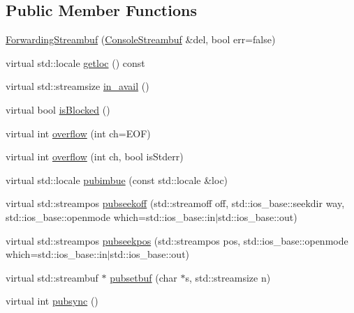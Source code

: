 \subsection*{Public Member Functions}
\begin{DoxyCompactItemize}
\item 
\mbox{\hyperlink{classstanfordcpplib_1_1ForwardingStreambuf_a8117dcf1a6c10e98afb196a6f1346dd9}{Forwarding\+Streambuf}} (\mbox{\hyperlink{classstanfordcpplib_1_1ConsoleStreambuf}{Console\+Streambuf}} \&del, bool err=false)
\item 
virtual std\+::locale \mbox{\hyperlink{classstanfordcpplib_1_1ForwardingStreambuf_aaea5d5971e30e03408abc9b4b9cdd332}{getloc}} () const
\item 
virtual std\+::streamsize \mbox{\hyperlink{classstanfordcpplib_1_1ForwardingStreambuf_a7c3ad202fdca7b02e80cce27e4fe009e}{in\+\_\+avail}} ()
\item 
virtual bool \mbox{\hyperlink{classstanfordcpplib_1_1ForwardingStreambuf_a61d5d93ba4956eefeb2e3d617d34c801}{is\+Blocked}} ()
\item 
virtual int \mbox{\hyperlink{classstanfordcpplib_1_1ForwardingStreambuf_adccb3cd5475ba3c83bc2b0a8cbd731c0}{overflow}} (int ch=E\+OF)
\item 
virtual int \mbox{\hyperlink{classstanfordcpplib_1_1ForwardingStreambuf_a5cfed6bdc955e2129ced962625045f8e}{overflow}} (int ch, bool is\+Stderr)
\item 
virtual std\+::locale \mbox{\hyperlink{classstanfordcpplib_1_1ForwardingStreambuf_a4b6e7141e08afcaf0fbe64222218d291}{pubimbue}} (const std\+::locale \&loc)
\item 
virtual std\+::streampos \mbox{\hyperlink{classstanfordcpplib_1_1ForwardingStreambuf_a19deb4f37c57fc93e0047e3db4f9d41e}{pubseekoff}} (std\+::streamoff off, std\+::ios\+\_\+base\+::seekdir way, std\+::ios\+\_\+base\+::openmode which=std\+::ios\+\_\+base\+::in$\vert$std\+::ios\+\_\+base\+::out)
\item 
virtual std\+::streampos \mbox{\hyperlink{classstanfordcpplib_1_1ForwardingStreambuf_aa603647db2d03b8bde5e5782b6472575}{pubseekpos}} (std\+::streampos pos, std\+::ios\+\_\+base\+::openmode which=std\+::ios\+\_\+base\+::in$\vert$std\+::ios\+\_\+base\+::out)
\item 
virtual std\+::streambuf $\ast$ \mbox{\hyperlink{classstanfordcpplib_1_1ForwardingStreambuf_a7d5bdeefe1c21ccce88dccedff1ab495}{pubsetbuf}} (char $\ast$s, std\+::streamsize n)
\item 
virtual int \mbox{\hyperlink{classstanfordcpplib_1_1ForwardingStreambuf_a104a7d4fba2c0e96a198cedb7c8cfa5f}{pubsync}} ()

\end{DoxyCompactItemize}
